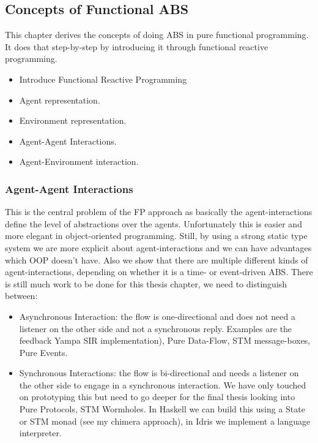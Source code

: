 \subsection{Concepts of Functional ABS}
This chapter derives the concepts of doing ABS in pure functional programming. It does that step-by-step by introducing it through functional reactive programming.

\begin{itemize}
	\item Introduce Functional Reactive Programming
	\item Agent representation.
	\item Environment representation.
	\item Agent-Agent Interactions.
	\item Agent-Environment interaction.
\end{itemize}

\subsubsection{Agent-Agent Interactions}
This is the central problem of the FP approach as basically the agent-interactions define the level of abstractions over the agents. Unfortunately this is easier and more elegant in object-oriented programming. Still, by using a strong static type system we are more explicit about agent-interactions and we can have advantages which OOP doesn't have. Also we show that there are multiple different kinds of agent-interactions, depending on whether it is a time- or event-driven ABS.
There is still much work to be done for this thesis chapter, we need to distinguish between:

\begin{itemize}
	\item Asynchronous Interaction: the flow is one-directional and does not need a listener on the other side and not a synchronous reply. Examples are the feedback Yampa SIR implementation), Pure Data-Flow, STM message-boxes, Pure Events.
	\item Synchronous Interactions: the flow is bi-directional and needs a listener on the other side to engage in a synchronous interaction. We have only touched on prototyping this but need to go deeper for the final thesis looking into Pure Protocols, STM Wormholes. In Haskell we can build this using a State or STM monad (see my chimera approach), in Idris we implement a language interpreter.
\end{itemize}


